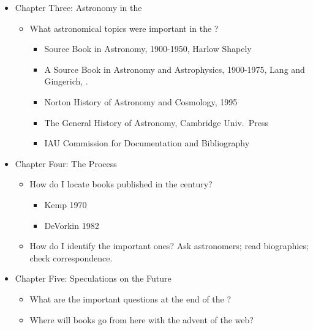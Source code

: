 \begin{itemize}
	\item Chapter Three: Astronomy in the 
		\begin{itemize}
		  \item What astronomical topics were important in the ?
				\begin{itemize}
					\item Source Book in Astronomy, 1900-1950, Harlow Shapely \cite{shapley:1960}
					\item A Source Book in Astronomy and Astrophysics, 1900-1975, Lang and Gingerich,
					 \cite{lang:1978}.
					\item Norton History of Astronomy and Cosmology, 1995
					\item The General History of Astronomy, Cambridge Univ.\ Press
					\item IAU Commission for Documentation and Bibliography
				\end{itemize}	
			\end{itemize}

	\item Chapter Four: The Process
		\begin{itemize}
			\item How do I locate books published in the century?
			\begin{itemize}
				\item Kemp 1970
				\item DeVorkin 1982
			\end{itemize}
			\item How do I identify the important ones? Ask astronomers; read biographies; check
			correspondence.
		\end{itemize}
		
	\item Chapter Five: Speculations on the Future
		\begin{itemize}
			\item What are the important questions at the end of the ?
			\item Where will books go from here with the advent of the web?
		\end{itemize}

\end{itemize}
